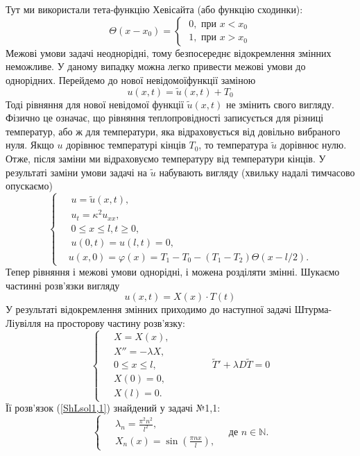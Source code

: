 Тут ми використали тета-функцію Хевісайта (або функцію сходинки):
\begin{equation*}
    \Theta(x - x_0) = 
    \begin{cases}
        \;0, \text{ при } x < x_0\\
        \;1, \text{ при } x > x_0
    \end{cases}    
\end{equation*}
Межові умови задачі неоднорідні, тому безпосереднє відокремлення змінних неможливе. У даному випадку можна легко привести межові умови до однорідних. Перейдемо до нової невідомоїфункції заміною\[u(x,t) = \widetilde{u}(x,t) + T_0 \]Тоді рівняння для нової невідомої функції $\widetilde{u}(x,t)$ не змінить свого вигляду. Фізично це означає, що рівняння теплопровідності  записується для різниці температур, або ж для температури, яка відраховується від довільно вибраного нуля. Якщо $u$ дорівнює температурі кінців $T_0$, то температура $\widetilde{u}$ дорівнює нулю. Отже, після заміни ми відраховуємо температуру від температури кінців.  У результаті заміни умови задачі на $\widetilde{u}$ набувають вигляду (хвильку надалі тимчасово опускаємо)
\begin{equation} \label{cond4,2 tilde}
    \left\{ \begin{aligned}
        &\;u = \widetilde{u}(x,t), \\
        &\;u_{t} = \kappa^2 u_{xx}, \\
        &\;0 \leq x \leq l, t \geq 0, \\
        &\;u(0,t) = u(l,t) = 0,\\
        &u(x,0) = \varphi(x) = T_1 - T_0 - (T_1 - T_2)\Theta(x - l/2).
    \end{aligned} \right.
\end{equation}
Тепер  рівняння і межові умови однорідні, і можена розділяти змінні. Шукаємо частинні розв'язки вигляду
\begin{equation} \label{subst4,2}
    u(x,t) = X(x)\cdot T(t) 
\end{equation}
У результаті відокремлення змінних приходимо до наступної задачі Штурма-Ліувілля на просторову частину розв'язку:
\begin{equation} 
    \left\{ \begin{aligned}
        \;&X = X(x), \\  &X'' = -\lambda X, \\ &0 \leq x \leq l, \\  &X(0) = 0, \\ &X(l) = 0. 
    \end{aligned} \right.
    \qquad\qquad
    \widetilde{T}' + \lambda D \widetilde{T} = 0
\end{equation}
Її розв'язок  (\ref{ShLsol1,1}) знайдений у задачі №1,1:
\begin{equation} 
    \left\{ \begin{aligned}
        \;&\lambda_n = \frac{\pi^2 n^2}{l^2},\\ 
        &X_n(x) = \sin\left(\frac{\pi n x}{l}\right),
    \end{aligned} \right.
    \quad \text{де } n \in \mathbb{N}.
\end{equation}

